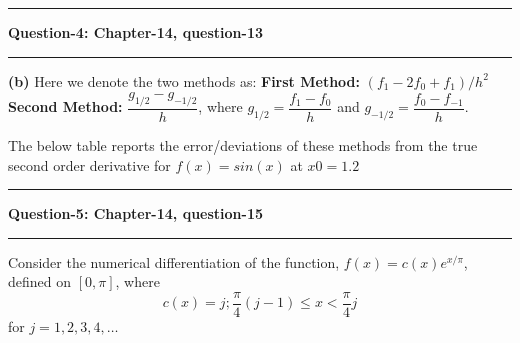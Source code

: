 \documentclass{article}
\newcommand\question[2]{\vspace{.25in}\hrule\textbf{#1: #2}\hrule\vspace{.10in}}
\renewcommand\part[1]{\vspace{.10in}\textbf{(#1)}}
\begin{document}
  

  \question{Question-4}{Chapter-14, question-13}
  \part{b} Here we denote the two methods as:\newline
	  \textbf{First Method:} $(f_1 - 2f_0 + f_1)/h^2$ \newline
	  \textbf{Second Method:} $\dfrac{g_{1/2} - g_{-1/2}}{h}$, where $g_{1/2} = \dfrac{f_1 - f_0}{h}$ and $g_{-1/2} = \dfrac{f_0 - f_{-1}}{h}$.

	  The below table reports the error/deviations of these methods from the true second order derivative for $f(x)=sin(x)$ at $x0=1.2$

  \question{Question-5}{Chapter-14, question-15}
  Consider the numerical differentiation of the function, $f(x) = c(x)e^{x/\pi}$, defined on $[0,\pi]$, where
  \[c(x) = j; \dfrac{\pi}{4}(j-1) \leq x < \dfrac{\pi}{4}j\]
  for $j=1,2,3,4,\dots$
\end{document}
